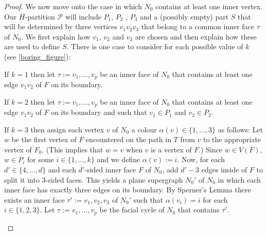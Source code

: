 \documentclass{patmorin}
\theoremstyle{plain}
\theoremstyle{definition}
\begin{document}
\begin{proof}
We now move onto the case in which $N_0$ contains at least one inner vertex.
Our $H$-partition $\mathcal{P}$ will include $P_1$, $P_2$ , $P_3$ and a (possibly empty) part $S$ that will be determined by three vertices $v_1v_2v_3$ that belong to a common inner face $\tau$ of $N_0$.  We first explain how $v_1$, $v_2$ and $v_3$ are chosen and then explain how these are used to define $S$.  There is one case to consider for each possible value of $k$ (see \cref{boring_figure}):

\begin{compactenum}
		\item If $k=1$ then let $\tau:=v_1,\ldots,v_p$ be an inner face of $N_0$ that contains at least one edge $v_1v_2$ of $F$ on its boundary.

		\item If $k= 2$ then let $\tau:=v_1,\ldots,v_p$ be an inner face of $N_0$ that contains at least one edge $v_1v_2$ of $F$ on its boundary and such that $v_1\in P_1$ and $v_2\in P_2$.

		\item If $k=3$ then assign each vertex $v$ of $N_0$ a colour $\alpha(v)\in\{1,\ldots,3\}$ as follows:  Let $w$ be the first vertex of $F$ encountered on the path in $T$ from $v$ to the appropriate vertex of $F_0$.  (This implies that $w=v$ when $v$ is a vertex of $F$.)  Since $w\in V(F)$, $w\in P_i$ for some $i\in\{1,\ldots,k\}$ and we define $\alpha(v):=i$.  Now, for each $d'\in\{4,\ldots,d\}$ and each $d'$-sided inner face $F$ of $N_0$, add $d'-3$ edges inside of $F$ to split it into $3$-sided faces.  This yields a plane supergraph $N_0'$ of $N_0$ in which each inner face has exactly three edges on its boundary. By Sperner's Lemma there exists an inner face $\tau':=v_1,v_2,v_3$ of $N_0'$ such that $\alpha(v_i)=i$ for each $i\in\{1,2,3\}$.  Let $\tau:=v_1,\ldots,v_p$ be  the facial cycle of $N_0$ that contains $\tau'$.
	\end{compactenum}



\end{proof}
\end{document}

